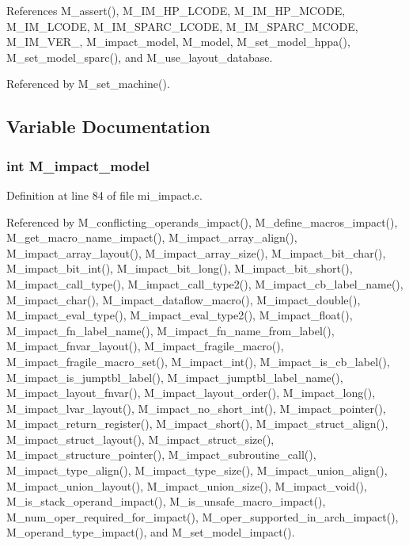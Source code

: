 References M\_\-assert(), M\_\-IM\_\-HP\_\-LCODE, M\_\-IM\_\-HP\_\-MCODE, M\_\-IM\_\-LCODE, M\_\-IM\_\-SPARC\_\-LCODE, M\_\-IM\_\-SPARC\_\-MCODE, M\_\-IM\_\-VER\_, M\_\-impact\_\-model, M\_\-model, M\_\-set\_\-model\_\-hppa(), M\_\-set\_\-model\_\-sparc(), and M\_\-use\_\-layout\_\-database.

Referenced by M\_\-set\_\-machine().

\subsection{Variable Documentation}
\subsubsection{\setlength{\rightskip}{0pt plus 5cm}int \bf{M\_\-impact\_\-model}}\label{m__impact_8h_6bc09fd2e80115fe0235158cc800ead0}




Definition at line 84 of file mi\_\-impact.c.

Referenced by M\_\-conflicting\_\-operands\_\-impact(), M\_\-define\_\-macros\_\-impact(), M\_\-get\_\-macro\_\-name\_\-impact(), M\_\-impact\_\-array\_\-align(), M\_\-impact\_\-array\_\-layout(), M\_\-impact\_\-array\_\-size(), M\_\-impact\_\-bit\_\-char(), M\_\-impact\_\-bit\_\-int(), M\_\-impact\_\-bit\_\-long(), M\_\-impact\_\-bit\_\-short(), M\_\-impact\_\-call\_\-type(), M\_\-impact\_\-call\_\-type2(), M\_\-impact\_\-cb\_\-label\_\-name(), M\_\-impact\_\-char(), M\_\-impact\_\-dataflow\_\-macro(), M\_\-impact\_\-double(), M\_\-impact\_\-eval\_\-type(), M\_\-impact\_\-eval\_\-type2(), M\_\-impact\_\-float(), M\_\-impact\_\-fn\_\-label\_\-name(), M\_\-impact\_\-fn\_\-name\_\-from\_\-label(), M\_\-impact\_\-fnvar\_\-layout(), M\_\-impact\_\-fragile\_\-macro(), M\_\-impact\_\-fragile\_\-macro\_\-set(), M\_\-impact\_\-int(), M\_\-impact\_\-is\_\-cb\_\-label(), M\_\-impact\_\-is\_\-jumptbl\_\-label(), M\_\-impact\_\-jumptbl\_\-label\_\-name(), M\_\-impact\_\-layout\_\-fnvar(), M\_\-impact\_\-layout\_\-order(), M\_\-impact\_\-long(), M\_\-impact\_\-lvar\_\-layout(), M\_\-impact\_\-no\_\-short\_\-int(), M\_\-impact\_\-pointer(), M\_\-impact\_\-return\_\-register(), M\_\-impact\_\-short(), M\_\-impact\_\-struct\_\-align(), M\_\-impact\_\-struct\_\-layout(), M\_\-impact\_\-struct\_\-size(), M\_\-impact\_\-structure\_\-pointer(), M\_\-impact\_\-subroutine\_\-call(), M\_\-impact\_\-type\_\-align(), M\_\-impact\_\-type\_\-size(), M\_\-impact\_\-union\_\-align(), M\_\-impact\_\-union\_\-layout(), M\_\-impact\_\-union\_\-size(), M\_\-impact\_\-void(), M\_\-is\_\-stack\_\-operand\_\-impact(), M\_\-is\_\-unsafe\_\-macro\_\-impact(), M\_\-num\_\-oper\_\-required\_\-for\_\-impact(), M\_\-oper\_\-supported\_\-in\_\-arch\_\-impact(), M\_\-operand\_\-type\_\-impact(), and M\_\-set\_\-model\_\-impact().